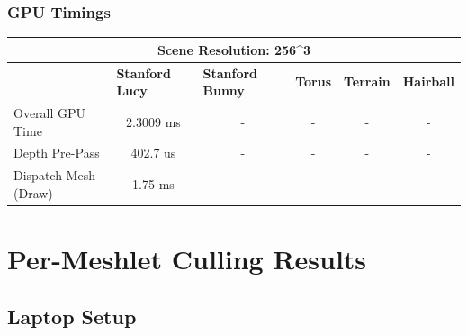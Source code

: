 \subsubsection*{GPU Timings}

\begin{table}[h]
    \begin{tabular}{|lccccc|}
    \hline
    \multicolumn{6}{|c|}{\textbf{Scene Resolution: 256\textasciicircum{}3}}                                                                                                                                                                                                         \\ \hline
    \multicolumn{1}{|l|}{}                          & \multicolumn{1}{l|}{\textbf{Stanford Lucy}}   & \multicolumn{1}{l|}{\textbf{Stanford Bunny}}  & \multicolumn{1}{l|}{\textbf{Torus}}   & \multicolumn{1}{l|}{\textbf{Terrain}}     & \multicolumn{1}{l|}{\textbf{Hairball}}    \\ \hline
    \multicolumn{1}{|l|}{Overall GPU Time}          & \multicolumn{1}{c|}{2.3009 ms}                & \multicolumn{1}{c|}{-}                        & \multicolumn{1}{c|}{-}                & \multicolumn{1}{c|}{-}                    & \multicolumn{1}{c|}{-}                    \\
    \multicolumn{1}{|l|}{Depth Pre-Pass}            & \multicolumn{1}{c|}{402.7 us}                 & \multicolumn{1}{c|}{-}                        & \multicolumn{1}{c|}{-}                & \multicolumn{1}{c|}{-}                    & -                                         \\
    \multicolumn{1}{|l|}{Dispatch Mesh (Draw)}      & \multicolumn{1}{c|}{1.75 ms}                  & \multicolumn{1}{c|}{-}                        & \multicolumn{1}{c|}{-}                & \multicolumn{1}{c|}{-}                    & -                                         \\ \hline
    \end{tabular}
\end{table}





\section{Per-Meshlet Culling Results}

\subsection*{Laptop Setup}

